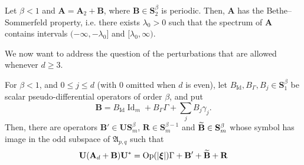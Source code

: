 \documentclass[AHL,Unicode,longabstracts,published]{cedram}
\DeclareMathOperator{\Op}{Op}
\DeclareMathOperator{\Id}{Id}
\newcommand{\bxi}{\boldsymbol \xi}
\newcommand{\BA}{\mathbf A}
\newcommand{\BB}{\mathbf B}
\newcommand{\BS}{\mathbf S}
\newcommand{\BR}{\mathbf R}
\newcommand{\BU}{\mathbf U}
\newcommand{\FA}{\mathfrak A}
\newcommand{\abs}[1]{\left\lvert #1 \right\rvert}
\let\oldtilde\tilde
\renewcommand*{\tilde}[1]{\mathchoice{\widetilde{#1}}{\widetilde{#1}}{\oldtilde{#1}}{\oldtilde{#1}}}
\begin{document}
\begin{theo}
Let $\beta < 1 $ and $\BA = \BA_2 + \BB$, where $\BB \in \BS_2^\beta$ is periodic. Then, $\BA$ has the Bethe--Sommerfeld property, i.e. there exists $\lambda_0 > 0 $ such that the spectrum of $\BA$ contains intervals $(-\infty, -\lambda_0]$ and $[\lambda_0,\infty)$.
\end{theo}

We now want to address the question of the perturbations that are allowed whenever $d \ge 3$.


\begin{prop}\label{prop:permittedperturbations}
For $\beta < 1$, and $0 \le j \le d$ (with $0$ omitted when $d$ is even), let $B_{\Id}, B_\Gamma, B_j \in \BS_1^\beta$ be scalar pseudo-differential operators of order $\beta$, and put
\begin{equation}
\BB = B_{\Id} \Id_m + B_\Gamma \Gamma + \sum_j B_j \gamma_j.
\end{equation}
Then, there are operators $\BB' \in \BU\BS^\beta_m$, $\BR \in \BS_m^{\beta -1 }$ and $\tilde \BB \in
\BS_m^\beta$ whose symbol has image in the odd subspace of $\FA_{p,q}$ such that
\begin{equation}\label{eq:afterunit}
\BU (\BA_d + \BB) \BU^* = \Op(\abs \bxi) \Gamma + \BB' + \tilde \BB + \BR
\end{equation}
\end{prop}
\end{document}
